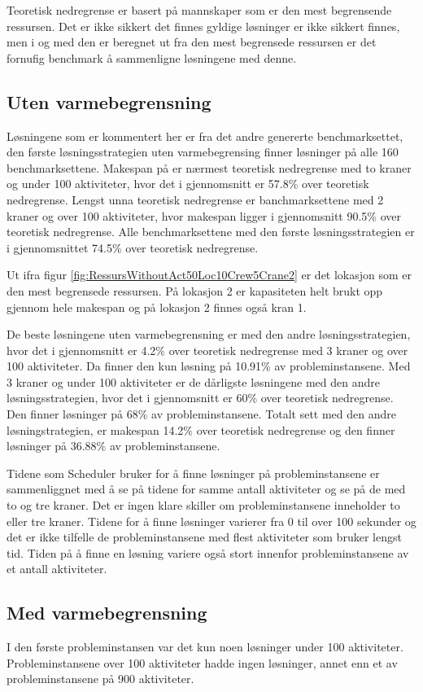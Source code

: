 Teoretisk nedregrense er basert på mannskaper som er den mest begrensende ressursen. Det er ikke sikkert det finnes gyldige løsninger er ikke sikkert finnes, men i og med den er beregnet ut fra den mest begrensede ressursen er det fornufig benchmark å sammenligne løsningene med denne.

\subsection{Uten varmebegrensning}
Løsningene som er kommentert her er fra det andre genererte benchmarksettet, den første løsningsstrategien uten varmebegrensing finner løsninger på alle 160 benchmarksettene. Makespan på er nærmest teoretisk nedregrense med to kraner og under 100 aktiviteter, hvor det i gjennomsnitt er 57.8\% over teoretisk nedregrense. Lengst unna teoretisk nedregrense er banchmarksettene med 2 kraner og over 100 aktiviteter, hvor makespan ligger i gjennomsnitt 90.5\% over teoretisk nedregrense. Alle benchmarksettene med den første løsningsstrategien er i gjennomsnittet 74.5\% over teoretisk nedregrense.

Ut ifra figur \ref{fig:RessursWithoutAct50Loc10Crew5Crane2} er det lokasjon som er den mest begrensede ressursen. På lokasjon 2 er kapasiteten helt brukt opp gjennom hele makespan og på lokasjon 2 finnes også kran 1.

De beste løsningene uten varmebegrensning er med den andre løsningsstrategien, hvor det i gjennomsnitt er 4.2\% over teoretisk nedregrense med 3 kraner og over 100 aktiviteter. Da finner den kun løsning på 10.91\% av probleminstansene. Med 3 kraner og under 100 aktiviteter er de dårligste løsningene med den andre løsningsstrategien, hvor det i gjennomsnitt er 60\% over teoretisk nedregrense. Den finner løsninger på 68\% av probleminstansene. Totalt sett med den andre løsningstrategien, er makespan 14.2\% over teoretisk nedregrense og den finner løsninger på 36.88\% av probleminstansene.

Tidene som Scheduler bruker for å finne løsninger på probleminstansene er sammenliggnet med å se på tidene for samme antall aktiviteter og se på de med to og tre kraner. Det er ingen klare skiller om probleminstansene inneholder to eller tre kraner. Tidene for å finne løsninger varierer fra 0 til over 100 sekunder og det er ikke tilfelle de probleminstansene med flest aktiviteter som bruker lengst tid. Tiden på å finne en løsning variere også stort innenfor probleminstansene av et antall aktiviteter.

\subsection{Med varmebegrensning}
I den første probleminstansen var det kun noen løsninger under 100 aktiviteter. Probleminstansene over 100 aktiviteter hadde ingen løsninger, annet enn et av probleminstansene på 900 aktiviteter.

